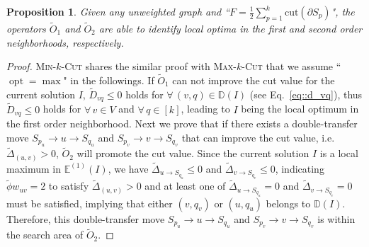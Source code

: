 \documentclass[12pt, a4paper]{article}%
\DeclareMathOperator*{\opt}{\ensuremath{opt}}
\newcommand{\cut}{\mathrm{cut}}
\numberwithin{equation}{section}
\theoremstyle{plain}
\newtheorem{prop}{Proposition}
\newcommand{\blue}{\textcolor{blue}}
\begin{document}
			\begin{prop}
				\label{thm::maxkcut}
				Given any unweighted graph and ``$F=\frac{1}{2}\sum_{p=1}^k\cut(\partial S_p)$", the operators $\widetilde{O}_1$ and $\widetilde{O}_2$ are able to identify local optima in the first and second order neighborhoods, respectively.
			\end{prop}
			\begin{proof}
				\textsc{Min}-$k$-\textsc{Cut} shares the similar proof with \textsc{Max}-$k$-\textsc{Cut} that we assume ``$\opt=\max$" in the followings.
				If $\widetilde{O}_1$ can not improve the cut value for the current solution $I$, $\widetilde{D}_{vq}\leq 0$ holds for $\forall\,(v,q)\in \mathbb{D}(I)$ (see Eq.~\eqref{eq::d_vq}), thus $\widetilde{D}_{vq}\leq 0$ holds for $\forall\,v\in V$ and $\forall\,q\in[k]$, leading to $I$ being the local optimum in the first order neighborhood. Next we prove that if there exists a double-transfer move $S_{p_u}\rightarrow u\rightarrow S_{q_u}$ and $S_{p_v}\rightarrow v \rightarrow S_{q_v}$ that can improve the cut value, i.e. $\widetilde{\Delta}_{(u,v)}>0$, $\widetilde{O}_2$ will promote the cut value. Since the current solution $I$ is a local maximum in $\mathbb{E}^{(1)}(I)$, we have $\widetilde{\Delta}_{u\rightarrow S_{q_u}}\leq 0$ and $\widetilde{\Delta}_{v\rightarrow S_{q_v}}\leq 0$, indicating $\widetilde{\phi}w_{uv}=2$ to satisfy $\widetilde{\Delta}_{(u,v)}>0$ and at least one of $\widetilde{\Delta}_{u\rightarrow S_{q_u}}=0$ and $\widetilde{\Delta}_{v\rightarrow S_{q_v}}=0$ must be satisfied, implying that either $(v,q_v)$ or $(u,q_u)$ belongs to $\mathbb{D}(I)$. Therefore, this double-transfer move $S_{p_u}\rightarrow u\rightarrow S_{q_u}$ and $S_{p_v}\rightarrow v \rightarrow S_{q_v}$ is within the search area of $\widetilde{O}_2$.
			\end{proof}
			
			
			
			
			
			
			
			
			
\end{document}
